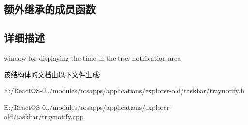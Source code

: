 \subsection*{额外继承的成员函数}


\subsection{详细描述}
window for displaying the time in the tray notification area 

该结构体的文档由以下文件生成\+:\begin{DoxyCompactItemize}
\item 
E\+:/\+React\+O\+S-\/0../modules/rosapps/applications/explorer-\/old/taskbar/traynotify.\+h\item 
E\+:/\+React\+O\+S-\/0../modules/rosapps/applications/explorer-\/old/taskbar/traynotify.\+cpp\end{DoxyCompactItemize}
